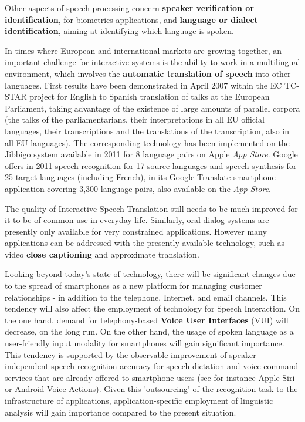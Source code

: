 \documentclass[]{../metanetpaper}
\begin{document}
\begin{multicols}{2}
Other aspects of speech processing concern {\bf speaker verification or
identification}, for biometrics applications, and {\bf language or dialect
identification}, aiming at identifying which language is spoken.

In times where European and international markets are growing
together, an important challenge for interactive systems is the
ability to work in a multilingual environment, which involves the
{\bf automatic translation of speech} into other languages. First results
have been demonstrated in April 2007 within the EC TC-STAR\cite{tcstarurl} project
for English to Spanish translation of talks at the European
Parliament, taking advantage of the existence of large amounts of
parallel corpora (the talks of the parliamentarians, their
interpretations in all EU official languages, their transcriptions and
the translations of the transcription, also in all EU languages). The
corresponding technology has been implemented on the Jibbigo\cite{jibbigo} system
available in 2011 for 8 language pairs on Apple {\em App Store}. Google offers
in 2011 speech recognition for 17 source languages and speech synthesis
for 25 target languages (including French), in its Google Translate
smartphone application covering 3,300 language pairs, also available
on the {\em App Store}.

The quality of Interactive Speech Translation still needs to be much
improved for it to be of common use in everyday life. Similarly, oral
dialog systems are presently only available for very constrained
applications. However many applications can be addressed with the
presently available technology, such as video {\bf close captioning}
and approximate translation.

Looking beyond today{\mbox '}s state of technology, there will be
significant changes due to the spread of smartphones as a new platform
for managing customer relationships - in addition to the telephone,
Internet, and email channels. This tendency will also affect the
employment of technology for Speech Interaction. On the one hand,
demand for telephony-based {\bf Voice User Interfaces} (VUI) will
decrease, on the long run. On the other hand, the usage of spoken
language as a user-friendly input modality for smartphones will gain
significant importance. This tendency is supported by the observable
improvement of speaker-independent speech recognition accuracy for
speech dictation and voice command services that are already offered
to smartphone users (see for instance Apple Siri or Android Voice
Actions). Given this {\mbox '}outsourcing{\mbox '} of the recognition
task to the infrastructure of applications, application-specific
employment of linguistic analysis will gain importance compared to the
present situation.


\end{multicols}
\end{document}
